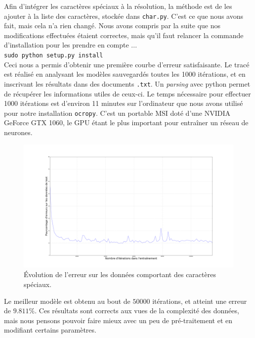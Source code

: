 \documentclass{article}
\begin{document}
Afin d'intégrer les caractères spéciaux à la résolution, la méthode est de les ajouter à la liste des caractères, stockée dans \texttt{char.py}. C'est ce que nous avons fait, mais cela n'a rien changé. Nous avons compris par la suite que nos modifications effectuées étaient correctes, mais qu'il faut relancer la commande d'installation pour les prendre en compte ... \\
\texttt{sudo python setup.py install} \\

Ceci nous a permis d'obtenir une première courbe d'erreur satisfaisante. Le tracé est réalisé en analysant les modèles sauvegardés toutes les 1000 itérations, et en inscrivant les résultats dans des documents \texttt{.txt}. Un \textit{parsing} avec python permet de récupérer les informations utiles de ceux-ci. 
Le temps nécessaire pour effectuer 1000 itérations est d'environ 11 minutes sur l'ordinateur que nous avons utilisé pour notre installation \texttt{ocropy}. C'est un portable MSI doté d'une NVIDIA GeForce GTX 1060, le GPU étant le plus important pour entraîner un réseau de neurones.

\begin{figure}[!h] 
	\center
	\includegraphics[width=13cm]{error_default.png}
	\caption{Évolution de l'erreur sur les données comportant des caractères spéciaux.}
	\label{err_default}
\end{figure}

Le meilleur modèle est obtenu au bout de $50 000$ itérations, et atteint une erreur de $9.811\%$. Ces résultats sont corrects aux vues de la complexité des données, mais nous pensons pouvoir faire mieux avec un peu de pré-traitement et en modifiant certains paramètres.
\end{document}
